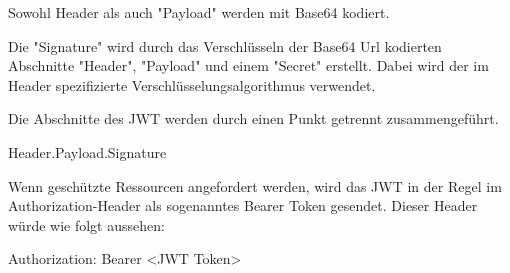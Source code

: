 Sowohl Header als auch "Payload" werden mit Base64 kodiert.

Die "Signature" wird durch das Verschlüsseln der Base64 Url kodierten Abschnitte "Header", "Payload" und einem "Secret" erstellt. 
Dabei wird der im Header spezifizierte Verschlüsselungsalgorithmus verwendet.\cite{RFC7519}\cite{WdsJWT}

Die Abschnitte des JWT werden durch einen Punkt getrennt zusammengeführt. 

{\ttfamily Header.Payload.Signature}

Wenn geschützte Ressourcen angefordert werden, wird das JWT in der Regel im Authorization-Header als sogenanntes Bearer Token gesendet. Dieser Header würde wie folgt aussehen\cite{Auth0JWT}:

{\ttfamily Authorization: Bearer \textless JWT Token\textgreater}


